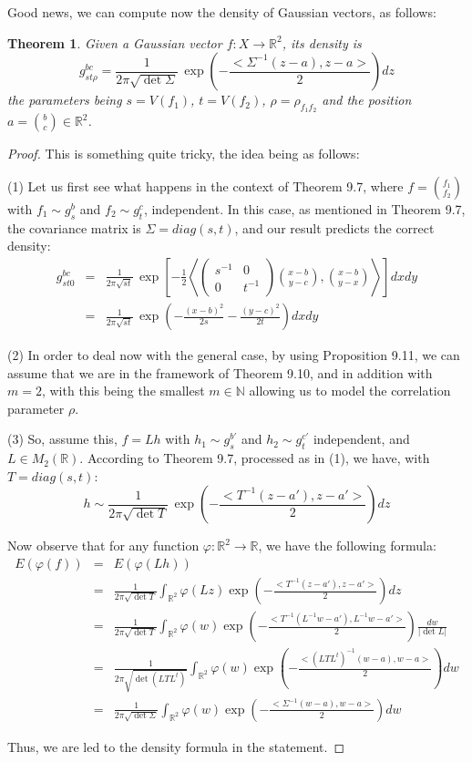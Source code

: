 \documentclass[12pt]{amsbook}
\newtheorem{theorem}{Theorem}[chapter]
\begin{document}
Good news, we can compute now the density of Gaussian vectors, as follows:

\begin{theorem}
Given a Gaussian vector $f:X\to\mathbb R^2$, its density is
$$g_{st\rho}^{bc}=\frac{1}{2\pi\sqrt{\det\Sigma}}\,\exp\left(-\frac{<\Sigma^{-1}(z-a),z-a>}{2}\right)dz$$
the parameters being $s=V(f_1)$, $t=V(f_2)$, $\rho=\rho_{f_1f_2}$ and the position $a=\binom{b}{c}\in\mathbb R^2$.
\end{theorem}

\begin{proof}
This is something quite tricky, the idea being as follows:

\medskip

(1) Let us first see what happens in the context of Theorem 9.7, where $f=\binom{f_1}{f_2}$ with $f_1\sim g_s^b$ and $f_2\sim g_t^c$, independent. In this case, as mentioned in Theorem 9.7, the covariance matrix is $\Sigma=diag(s,t)$, and our result predicts the correct density:
\begin{eqnarray*}
g_{st0}^{bc}
&=&\frac{1}{2\pi\sqrt{st}}\,\exp\left[-\frac{1}{2}\left<\begin{pmatrix}s^{-1}&0\\0&t^{-1}\end{pmatrix}\binom{x-b}{y-c},\binom{x-b}{y-x}\right>\right]dxdy\\
&=&\frac{1}{2\pi\sqrt{st}}\,\exp\left(-\frac{(x-b)^2}{2s}-\frac{(y-c)^2}{2t}\right)dxdy
\end{eqnarray*}

(2) In order to deal now with the general case, by using Proposition 9.11, we can assume that we are in the framework of Theorem 9.10, and in addition with $m=2$, with this being the smallest $m\in\mathbb N$ allowing us to model the correlation parameter $\rho$.

\medskip

(3) So, assume this, $f=Lh$ with $h_1\sim g_s^{b'}$ and $h_2\sim g_t^{c'}$ independent, and $L\in M_2(\mathbb R)$. According to Theorem 9.7, processed as in (1), we have, with $T=diag(s,t)$:
$$h\sim\frac{1}{2\pi\sqrt{\det T}}\,\exp\left(-\frac{<T^{-1}(z-a'),z-a'>}{2}\right)dz$$

Now observe that for any function $\varphi:\mathbb R^2\to\mathbb R$, we have the following formula:
\begin{eqnarray*}
E(\varphi(f))
&=&E(\varphi(Lh))\\
&=&\frac{1}{2\pi\sqrt{\det T}}\int_{\mathbb R^2}\varphi(Lz)\exp\left(-\frac{<T^{-1}(z-a'),z-a'>}{2}\right)dz\\
&=&\frac{1}{2\pi\sqrt{\det T}}\int_{\mathbb R^2}\varphi(w)\exp\left(-\frac{<T^{-1}(L^{-1}w-a'),L^{-1}w-a'>}{2}\right)\frac{dw}{|\det L|}\\
&=&\frac{1}{2\pi\sqrt{\det(LTL^t)}}\int_{\mathbb R^2}\varphi(w)\exp\left(-\frac{<(LTL^t)^{-1}(w-a),w-a>}{2}\right)dw\\
&=&\frac{1}{2\pi\sqrt{\det\Sigma}}\int_{\mathbb R^2}\varphi(w)\exp\left(-\frac{<\Sigma^{-1}(w-a),w-a>}{2}\right)dw
\end{eqnarray*}

Thus, we are led to the density formula in the statement.
\end{proof}
\end{document}
